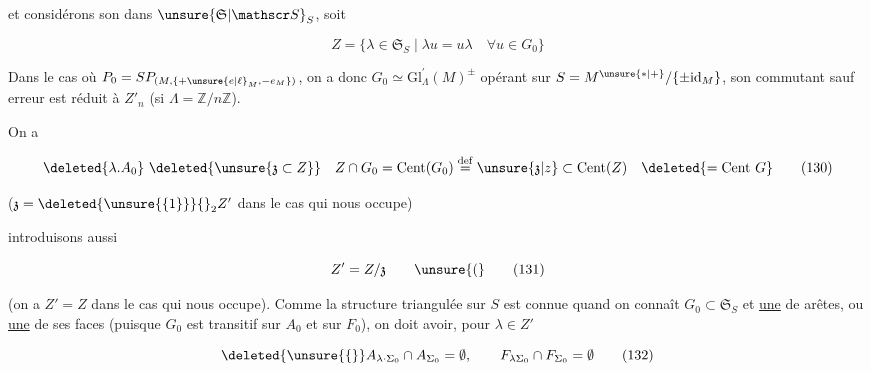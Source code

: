 
et considérons son  dans $\unsure{\mathfrak S|\mathscr S}_S$, soit

\[
 Z=\{\lambda\in\mathfrak S_S\mid\lambda u=u\lambda\quad\forall u\in G_0\}
 \tag*{(129)}
\]

Dans le cas où $P_0=SP_{(M,\{+\unsure{e|\ell}_M,-e_M\})}$, on a donc $G_0\simeq{\mathrm{Gl}}^{\prime}_\Lambda(M)^{\pm}$ opérant sur $S=M^{\unsure{*|+}}/\{\pm\mathrm{id}_M\}$, son commutant sauf erreur est réduit à $Z'_n$ (si $\Lambda=\mathbb Z/n\mathbb Z$).



 On a

\[
 \deleted{\lambda.A_0}\ \deleted{\unsure{\mathfrak z\subset Z}}
 \quad Z\cap G_0=\operatorname{Cent}(G_0)\overset{\mathrm{def}}{=}
 \unsure{\mathfrak z|z}\subset\operatorname{Cent}(Z)
 \quad\deleted{=\operatorname{Cent}\,G}
 \tag*{(130)}
\]

($\mathfrak z=\deleted{\unsure{\{1\}}}{}_{2}Z'$ dans le cas qui nous occupe)



 introduisons aussi

\[
 Z'=Z/\mathfrak z \qquad \unsure{(}
 \tag*{(131)}
\]

(on a $Z'=Z$ dans le cas qui nous occupe). Comme la structure triangulée  sur $S$ est connue quand on connaît $G_0\subset\mathfrak S_S$ et \uline{une} de  arêtes, ou \uline{une} de ses faces (puisque $G_0$ est transitif sur $A_0$ et sur $F_0$), on doit avoir, pour $\lambda\in Z'$

\[
 \deleted{\unsure{\{}} A_{\lambda\cdot\Sigma_0}\cap A_{\Sigma_0}=\emptyset,\qquad
 F_{\lambda\Sigma_0}\cap F_{\Sigma_0}=\emptyset
 \tag*{(132)}
\]

